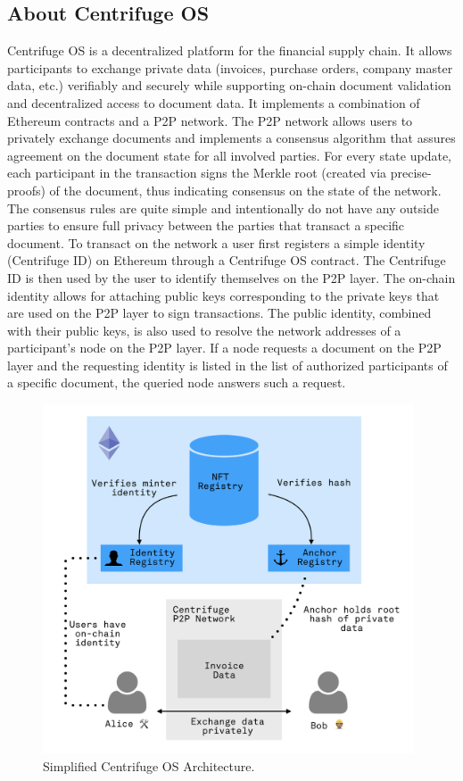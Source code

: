 \documentclass[a4paper, 10pt]{article}
\begin{document}
\subsection{About Centrifuge OS}
Centrifuge OS is a decentralized platform for the financial supply chain. It allows participants to exchange private data (invoices, purchase orders, company master data, etc.) verifiably and securely while supporting on-chain document validation and decentralized access to document data. It implements a combination of Ethereum contracts and a P2P network. The P2P network allows users to privately exchange documents and implements a consensus algorithm that assures agreement on the document state for all involved parties. For every state update, each participant in the transaction signs the Merkle root (created via precise-proofs) of the document, thus indicating consensus on the state of the network. The consensus rules are quite simple and intentionally do not have any outside parties to ensure full privacy between the parties that transact a specific document. To transact on the network a user first registers a simple identity (Centrifuge ID) on Ethereum through a Centrifuge OS contract. The Centrifuge ID is then used by the user to identify themselves on the P2P layer. The on-chain identity allows for attaching public keys corresponding to the private keys that are used on the P2P layer to sign transactions. The public identity, combined with their public keys, is also used to resolve the network addresses of a participant’s node on the P2P layer. If a node requests a document on the P2P layer and the requesting identity is listed in the list of authorized participants of a specific document, the queried node answers such a request. 

\begin{figure}[thpb]
  \centering
  \includegraphics[width=11cm]{drawings/cent_os_overview.png}
  \caption{Simplified Centrifuge OS Architecture.} 
  \label{cent_os_overview}
\end{figure}
\end{document}
